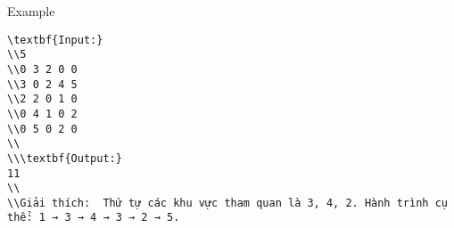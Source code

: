 Example  
\begin{verbatim}
\textbf{Input:}
\\5
\\0 3 2 0 0
\\3 0 2 4 5
\\2 2 0 1 0
\\0 4 1 0 2
\\0 5 0 2 0
\\
\\\textbf{Output:}
11
\\
\\Giải thích:  Thứ tự các khu vực tham quan là 3, 4, 2. Hành trình cụ thể: 1 → 3 → 4 → 3 → 2 → 5.\end{verbatim}